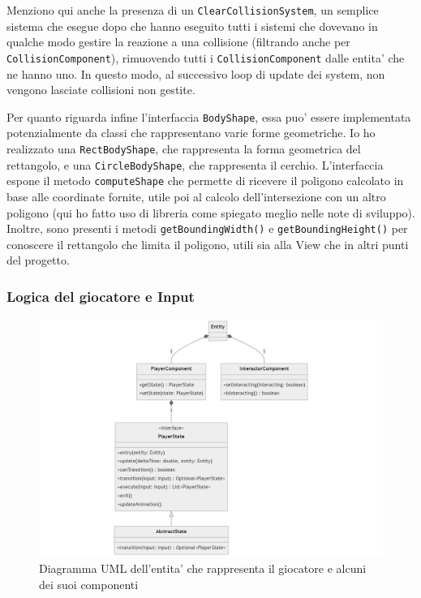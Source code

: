 \documentclass[a4paper,12pt]{report}
\begin{document}
Menziono qui anche la presenza di un \texttt{ClearCollisionSystem}, un semplice sistema che esegue dopo che hanno eseguito tutti i sistemi che dovevano in qualche modo gestire la reazione a una collisione (filtrando anche per \texttt{CollisionComponent}), rimuovendo tutti i \texttt{CollisionComponent} dalle entita' che ne hanno uno. In questo modo, al successivo loop di update dei system, non vengono lasciate collisioni non gestite.

Per quanto riguarda infine l'interfaccia \texttt{BodyShape}, essa puo' essere implementata potenzialmente da classi che rappresentano varie forme geometriche. Io ho realizzato una \texttt{RectBodyShape}, che rappresenta la forma geometrica del rettangolo, e una \texttt{CircleBodyShape}, che rappresenta il cerchio. L'interfaccia espone il metodo \texttt{computeShape} che permette di ricevere il poligono calcolato in base alle coordinate fornite, utile poi al calcolo dell'intersezione con un altro poligono (qui ho fatto uso di libreria come spiegato meglio nelle note di sviluppo). Inoltre, sono presenti i metodi \texttt{getBoundingWidth()} e \texttt{getBoundingHeight()} per conoscere il rettangolo che limita il poligono, utili sia alla View che in altri punti del progetto.

\newpage

\subsubsection{Logica del giocatore e Input}

\begin{figure}[h]
	\centering
	\includegraphics[width=\textwidth]{uml/uml_player.png}
	\caption{Diagramma UML dell'entita' che rappresenta il giocatore e alcuni dei suoi componenti}
\end{figure}
\end{document}
